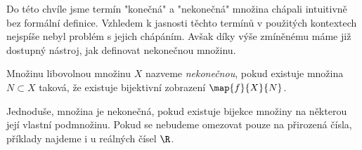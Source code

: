 Do této chvíle jsme termín "konečná" a "nekonečná" množina chápali intuitivně bez formální definice. Vzhledem k jasnosti těchto termínů v použitých kontextech nejspíše nebyl problém s jejich chápáním. Avšak díky výše zmíněnému máme již dostupný nástroj, jak definovat nekonečnou množinu.
\begin{definition}
    Množinu libovolnou množinu $X$ nazveme \emph{nekonečnou}, pokud existuje množina $N\subset X$ taková, že existuje bijektivní zobrazení $\map{f}{X}{N}$. 
\end{definition}
Jednoduše, množina je nekonečná, pokud existuje bijekce množiny na některou její vlastní podmnožinu. 
Pokud se nebudeme omezovat pouze na přirozená čísla, příklady najdeme i u reálných čísel $\R$.
